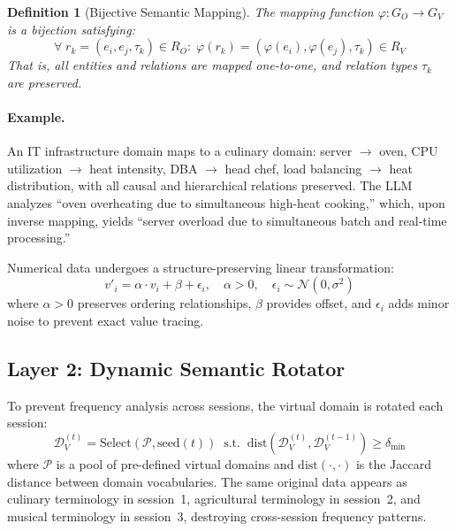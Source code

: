 \documentclass[11pt]{article}
\newtheorem{definition}{Definition}
\begin{document}
\begin{definition}[Bijective Semantic Mapping]
The mapping function $\varphi : G_O \to G_V$ is a bijection satisfying:
\begin{equation}
\forall\; r_k = (e_i, e_j, \tau_k) \in R_O :\; \varphi(r_k) = (\varphi(e_i), \varphi(e_j), \tau_k) \in R_V
\end{equation}
That is, all entities and relations are mapped one-to-one, and relation types $\tau_k$ are preserved.
\end{definition}

\paragraph{Example.} An IT infrastructure domain maps to a culinary domain: server $\to$ oven, CPU utilization $\to$ heat intensity, DBA $\to$ head chef, load balancing $\to$ heat distribution, with all causal and hierarchical relations preserved. The LLM analyzes ``oven overheating due to simultaneous high-heat cooking,'' which, upon inverse mapping, yields ``server overload due to simultaneous batch and real-time processing.''

Numerical data undergoes a structure-preserving linear transformation:
\begin{equation}
v'_i = \alpha \cdot v_i + \beta + \epsilon_i, \quad \alpha > 0, \quad \epsilon_i \sim \mathcal{N}(0, \sigma^2)
\end{equation}
where $\alpha > 0$ preserves ordering relationships, $\beta$ provides offset, and $\epsilon_i$ adds minor noise to prevent exact value tracing.

\subsection{Layer 2: Dynamic Semantic Rotator}
To prevent frequency analysis across sessions, the virtual domain is rotated each session:
\begin{equation}
\mathcal{D}_V^{(t)} = \text{Select}(\mathcal{P}, \text{seed}(t)) \;\;\text{s.t.}\;\; \text{dist}(\mathcal{D}_V^{(t)}, \mathcal{D}_V^{(t-1)}) \geq \delta_{\min}
\end{equation}
where $\mathcal{P}$ is a pool of pre-defined virtual domains and $\text{dist}(\cdot, \cdot)$ is the Jaccard distance between domain vocabularies. The same original data appears as culinary terminology in session~1, agricultural terminology in session~2, and musical terminology in session~3, destroying cross-session frequency patterns.
\end{document}
